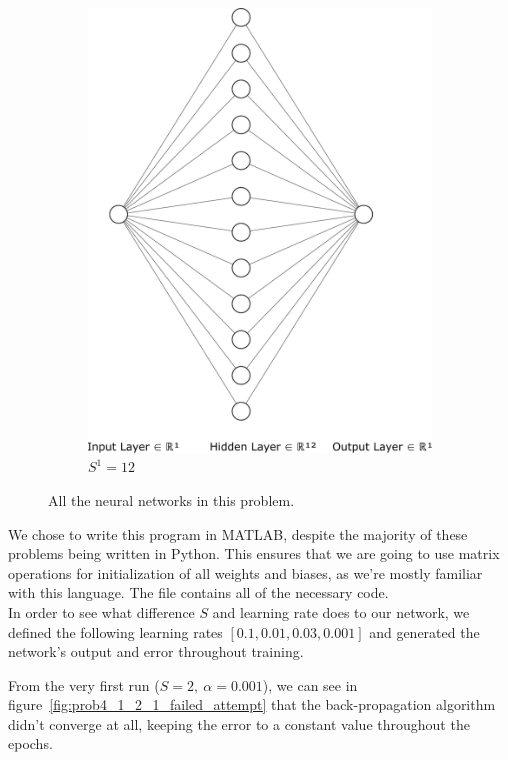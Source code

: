 \begin{figure}[htpb]
\begin{subfigure}{0.47\textwidth}
		\includegraphics[width=\textwidth]{../Problem 4/nn_1_12_1.pdf}
		\caption{$S^1=12$}
	\end{subfigure}
	\caption{All the neural networks in this problem.}
	\label{fig:prob4_nns}
\end{figure}

We chose to write this program in MATLAB, despite the majority of these problems being written in Python. This ensures that we are going to use matrix operations for initialization of all weights and biases, as we're mostly familiar with this language.
The file  contains all of the necessary code.\\

In order to see what difference $S$ and learning rate does to our network, we defined the following learning rates $\left[0.1, 0.01, 0.03, 0.001\right]$ and generated the network's output and error throughout training.

From the very first run ($S=2,\ \alpha=0.001$), we can see in figure~\ref{fig:prob4_1_2_1_failed_attempt} that the back-propagation algorithm didn't converge at all, keeping the error to a constant value throughout the epochs.

